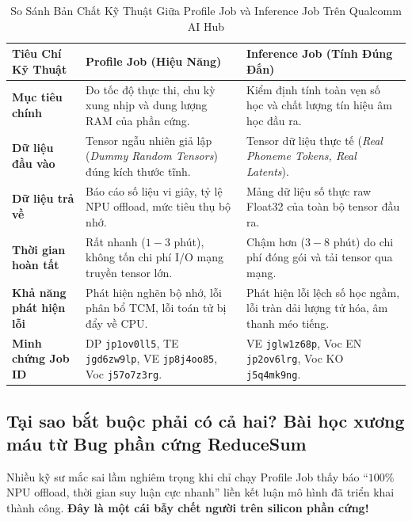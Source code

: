 \documentclass[11pt,a4paper,oneside,table]{report}
\begin{document}
\begin{table}[H]
\centering
\small
\sffamily
\caption{So Sánh Bản Chất Kỹ Thuật Giữa Profile Job và Inference Job Trên Qualcomm AI Hub}
\label{tab:profile_vs_inference}
\vspace{2mm}
\begin{tabularx}{\textwidth}{l p{6.0cm} p{6.0cm}}
\toprule
\textbf{Tiêu Chí Kỹ Thuật} & \textbf{Profile Job (Hiệu Năng)} & \textbf{Inference Job (Tính Đúng Đắn)} \\
\midrule
\textbf{Mục tiêu chính} & Đo tốc độ thực thi, chu kỳ xung nhịp và dung lượng RAM của phần cứng. & Kiểm định tính toàn vẹn số học và chất lượng tín hiệu âm học đầu ra. \\
\addlinespace
\textbf{Dữ liệu đầu vào} & Tensor ngẫu nhiên giả lập (\textit{Dummy Random Tensors}) đúng kích thước tĩnh. & Tensor dữ liệu thực tế (\textit{Real Phoneme Tokens, Real Latents}). \\
\addlinespace
\textbf{Dữ liệu trả về} & Báo cáo số liệu vi giây, tỷ lệ NPU offload, mức tiêu thụ bộ nhớ. & Mảng dữ liệu số thực raw Float32 của toàn bộ tensor đầu ra. \\
\addlinespace
\textbf{Thời gian hoàn tất} & Rất nhanh ($1 - 3$ phút), không tốn chi phí I/O mạng truyền tensor lớn. & Chậm hơn ($3 - 8$ phút) do chi phí đóng gói và tải tensor qua mạng. \\
\addlinespace
\textbf{Khả năng phát hiện lỗi} & Phát hiện nghẽn bộ nhớ, lỗi phân bổ TCM, lỗi toán tử bị đẩy về CPU. & Phát hiện lỗi lệch số học ngầm, lỗi tràn dải lượng tử hóa, âm thanh méo tiếng. \\
\addlinespace
\textbf{Minh chứng Job ID} & DP \texttt{jp1ov0ll5}, TE \texttt{jgd6zw9lp}, VE \texttt{jp8j4oo85}, Voc \texttt{j57o7z3rg}. & VE \texttt{jglw1z68p}, Voc EN \texttt{jp2ov6lrg}, Voc KO \texttt{j5q4mk9ng}. \\
\bottomrule
\end{tabularx}
\end{table}

\subsection{Tại sao bắt buộc phải có cả hai? Bài học xương máu từ Bug phần cứng ReduceSum}
Nhiều kỹ sư mắc sai lầm nghiêm trọng khi chỉ chạy Profile Job thấy báo ``$100\%$ NPU offload, thời gian suy luận cực nhanh'' liền kết luận mô hình đã triển khai thành công. \textbf{Đây là một cái bẫy chết người trên silicon phần cứng!}
\end{document}
